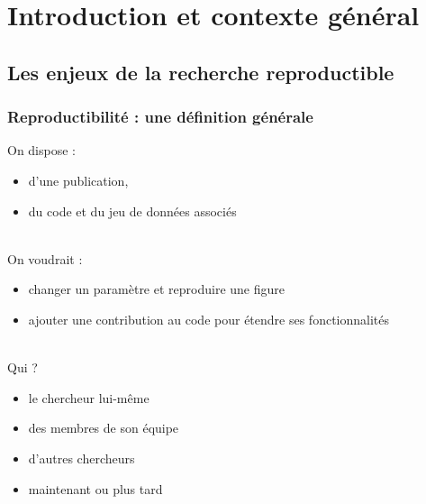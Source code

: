 \section{Introduction et contexte général}
\subsection{Les enjeux de la recherche reproductible}
\begin{frame}
\frametitle{Reproductibilité : une définition générale}
On dispose :
\begin{itemize}
  \item d'une publication,
  \item du code et du jeu de données associés 
\end{itemize}

~\\
On voudrait :  
\begin{itemize}
  \item changer un paramètre et reproduire une figure
  \item ajouter une contribution au code pour étendre ses fonctionnalités
\end{itemize}

~\\
Qui ? 
  \begin{itemize}
      \item le chercheur lui-même
      \item des membres de son équipe
      \item d'autres chercheurs
  \end{itemize}
  \begin{itemize}  
       \item[\ding{220}] \textcolor{maincolor}{maintenant ou plus tard}
  \end{itemize}

\end{frame}



